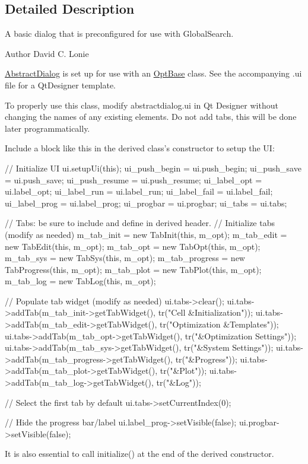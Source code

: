 \subsection{Detailed Description}
A basic dialog that is preconfigured for use with Global\-Search. 

\begin{DoxyAuthor}{Author}
David C. Lonie
\end{DoxyAuthor}
\hyperlink{classGlobalSearch_1_1AbstractDialog}{Abstract\-Dialog} is set up for use with an \hyperlink{classGlobalSearch_1_1OptBase}{Opt\-Base} class. See the accompanying .ui file for a Qt\-Designer template.

To properly use this class, modify abstractdialog.\-ui in Qt Designer without changing the names of any existing elements. Do not add tabs, this will be done later programmatically.

Include a block like this in the derived class's constructor to setup the U\-I\-: \begin{DoxyVerb}    // Initialize UI
    ui.setupUi(this);
    ui_push_begin   = ui.push_begin;
    ui_push_save    = ui.push_save;
    ui_push_resume  = ui.push_resume;
    ui_label_opt    = ui.label_opt;
    ui_label_run    = ui.label_run;
    ui_label_fail   = ui.label_fail;
    ui_label_prog   = ui.label_prog;
    ui_progbar      = ui.progbar;
    ui_tabs         = ui.tabs;

    // Tabs: be sure to include and define in derived header.
    // Initialize tabs (modify as needed)
    m_tab_init     = new TabInit(this, m_opt);
    m_tab_edit     = new TabEdit(this, m_opt);
    m_tab_opt      = new TabOpt(this, m_opt);
    m_tab_sys      = new TabSys(this, m_opt);
    m_tab_progress = new TabProgress(this, m_opt);
    m_tab_plot     = new TabPlot(this, m_opt);
    m_tab_log      = new TabLog(this, m_opt);

    // Populate tab widget (modify as needed)
    ui.tabs->clear();
    ui.tabs->addTab(m_tab_init->getTabWidget(),     tr("Cell &Initialization"));
    ui.tabs->addTab(m_tab_edit->getTabWidget(),     tr("Optimization &Templates"));
    ui.tabs->addTab(m_tab_opt->getTabWidget(),      tr("&Optimization Settings"));
    ui.tabs->addTab(m_tab_sys->getTabWidget(),      tr("&System Settings"));
    ui.tabs->addTab(m_tab_progress->getTabWidget(), tr("&Progress"));
    ui.tabs->addTab(m_tab_plot->getTabWidget(),     tr("&Plot"));
    ui.tabs->addTab(m_tab_log->getTabWidget(),      tr("&Log"));

    // Select the first tab by default
    ui.tabs->setCurrentIndex(0);

    // Hide the progress bar/label
    ui.label_prog->setVisible(false);
    ui.progbar->setVisible(false);
\end{DoxyVerb}
 \begin{DoxyVerb} It is also essential to call initialize() at the end of the
 derived constructor.\end{DoxyVerb}
 


